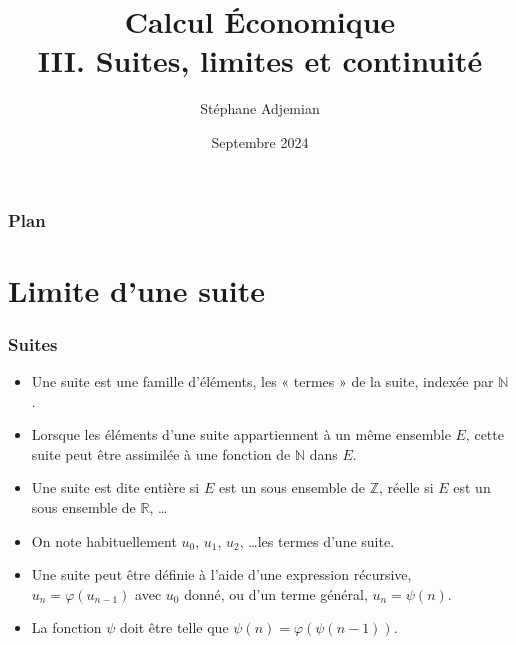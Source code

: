 \documentclass[10pt,notheorems]{beamer}
\theoremstyle{plain}
\theoremstyle{definition} %
\begin{document}
\title{Calcul Économique\\\small{III. Suites, limites et continuité}}
\author[S. Adjemian]{Stéphane Adjemian}
 \date{Septembre 2024}

\begin{frame}
  \titlepage{}
\end{frame}

\begin{frame}
  \frametitle{Plan}
  \tableofcontents
\end{frame}


\section{Limite d'une suite}

\begin{frame}
  \frametitle{Suites}

  \begin{itemize}

  \item Une suite est une famille d'éléments, les « termes » de la suite, indexée par $\mathbb N$.\newline

  \item Lorsque les éléments d'une suite appartiennent à un même ensemble $E$, cette suite peut être assimilée à une fonction de $\mathbb N$ dans $E$.\newline

  \item Une suite est dite entière si $E$ est un sous ensemble de $\mathbb Z$, réelle si $E$ est un sous ensemble de $\mathbb R$, \dots\newline

  \item On note habituellement $u_0$, $u_1$, $u_2$, \ldots les termes d'une suite.\newline

  \item Une suite peut être définie à l'aide d'une expression récursive, $u_n = \varphi(u_{n-1})$ avec $u_0$ donné, ou  d'un terme général, $u_n = \psi(n)$.\newline

  \item La fonction $\psi$ doit être telle que $\psi(n) = \varphi(\psi(n-1))$.

  \end{itemize}

\end{frame}
\end{document}
